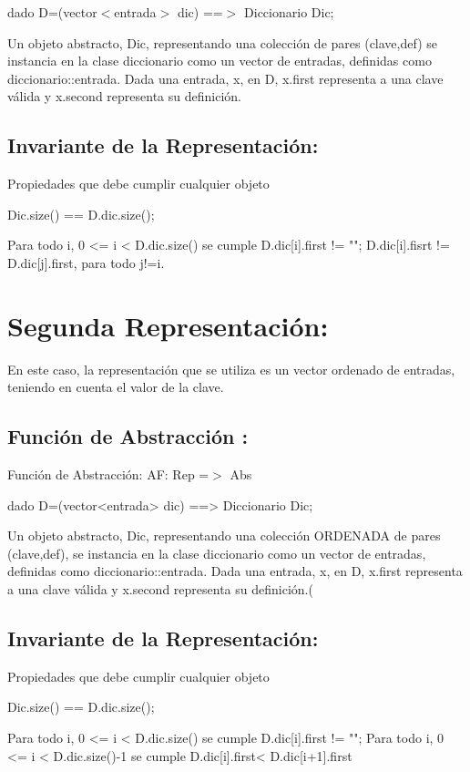dado D=(vector$<$entrada$>$ dic) ==$>$ Diccionario Dic;

Un objeto abstracto, Dic, representando una colección de pares (clave,def) se instancia en la clase diccionario como un vector de entradas, definidas como diccionario\-::entrada. Dada una entrada, x, en D, x.\-first representa a una clave válida y x.\-second representa su definición.\hypertarget{index_inv_sec1}{}\subsection{Invariante de la Representación\-:}\label{index_inv_sec1}
Propiedades que debe cumplir cualquier objeto


\begin{DoxyCode}
Dic.size() == D.dic.size();



Para todo i, 0 <= i < D.dic.size() se cumple
        D.dic[i].first != \textcolor{stringliteral}{""};
        D.dic[i].fisrt != D.dic[j].first, para todo j!=i.
\end{DoxyCode}
\hypertarget{index_segunda}{}\section{Segunda Representación\-:}\label{index_segunda}
En este caso, la representación que se utiliza es un vector ordenado de entradas, teniendo en cuenta el valor de la clave.\hypertarget{index_fact_sec2}{}\subsection{Función de Abstracción \-:}\label{index_fact_sec2}
Función de Abstracción\-: A\-F\-: Rep =$>$ Abs \begin{DoxyVerb}dado D=(vector<entrada>  dic) ==> Diccionario Dic;
\end{DoxyVerb}


Un objeto abstracto, Dic, representando una colección O\-R\-D\-E\-N\-A\-D\-A de pares (clave,def), se instancia en la clase diccionario como un vector de entradas, definidas como diccionario\-::entrada. Dada una entrada, x, en D, x.\-first representa a una clave válida y x.\-second representa su definición.(\hypertarget{index_inv_sec2}{}\subsection{Invariante de la Representación\-:}\label{index_inv_sec2}
Propiedades que debe cumplir cualquier objeto


\begin{DoxyCode}
Dic.size() == D.dic.size();

Para todo i, 0 <= i < D.dic.size() se cumple
        D.dic[i].first != \textcolor{stringliteral}{""};
Para todo i, 0 <= i < D.dic.size()-1 se cumple
        D.dic[i].first< D.dic[i+1].first
\end{DoxyCode}
 